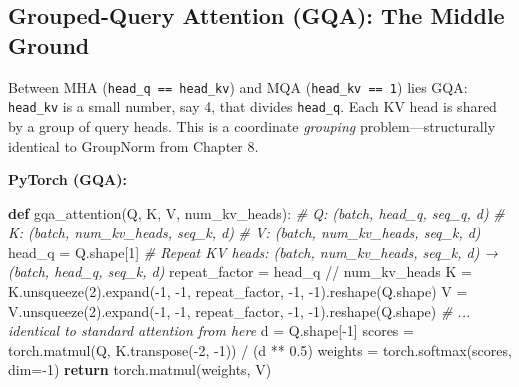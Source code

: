 \documentclass[11pt,titlepage]{article}
\newenvironment{Shaded}{}{}
\newcommand{\CommentTok}[1]{\textcolor[rgb]{0.38,0.63,0.69}{\textit{#1}}}
\newcommand{\ControlFlowTok}[1]{\textcolor[rgb]{0.00,0.44,0.13}{\textbf{#1}}}
\newcommand{\DecValTok}[1]{\textcolor[rgb]{0.25,0.63,0.44}{#1}}
\newcommand{\FloatTok}[1]{\textcolor[rgb]{0.25,0.63,0.44}{#1}}
\newcommand{\KeywordTok}[1]{\textcolor[rgb]{0.00,0.44,0.13}{\textbf{#1}}}
\newcommand{\NormalTok}[1]{#1}
\newcommand{\OperatorTok}[1]{\textcolor[rgb]{0.40,0.40,0.40}{#1}}
\begin{document}
\vspace{2em}

\hypertarget{grouped-query-attention-gqa-the-middle-ground}{%
\subsection{Grouped-Query Attention (GQA): The Middle
Ground}\label{grouped-query-attention-gqa-the-middle-ground}}

Between MHA (\texttt{head\_q\ ==\ head\_kv}) and MQA
(\texttt{head\_kv\ ==\ 1}) lies GQA: \texttt{head\_kv} is a small
number, say 4, that divides \texttt{head\_q}. Each KV head is shared by
a group of query heads. This is a coordinate \emph{grouping}
problem---structurally identical to GroupNorm from Chapter 8.

\textbf{PyTorch (GQA):}

\begin{Shaded}
\begin{Highlighting}[]
\KeywordTok{def}\NormalTok{ gqa_attention(Q, K, V, num_kv_heads):}
    \CommentTok{# Q: (batch, head_q, seq_q, d)}
    \CommentTok{# K: (batch, num_kv_heads, seq_k, d)}
    \CommentTok{# V: (batch, num_kv_heads, seq_k, d)}
\NormalTok{    head_q }\OperatorTok{=}\NormalTok{ Q.shape[}\DecValTok{1}\NormalTok{]}
    \CommentTok{# Repeat KV heads: (batch, num_kv_heads, seq_k, d) → (batch, head_q, seq_k, d)}
\NormalTok{    repeat_factor }\OperatorTok{=}\NormalTok{ head_q }\OperatorTok{//}\NormalTok{ num_kv_heads}
\NormalTok{    K }\OperatorTok{=}\NormalTok{ K.unsqueeze(}\DecValTok{2}\NormalTok{).expand(}\OperatorTok{-}\DecValTok{1}\NormalTok{, }\DecValTok{-1}\NormalTok{, repeat_factor, }\DecValTok{-1}\NormalTok{, }\DecValTok{-1}\NormalTok{).reshape(Q.shape)}
\NormalTok{    V }\OperatorTok{=}\NormalTok{ V.unsqueeze(}\DecValTok{2}\NormalTok{).expand(}\OperatorTok{-}\DecValTok{1}\NormalTok{, }\DecValTok{-1}\NormalTok{, repeat_factor, }\DecValTok{-1}\NormalTok{, }\DecValTok{-1}\NormalTok{).reshape(Q.shape)}
    \CommentTok{# ... identical to standard attention from here}
\NormalTok{    d }\OperatorTok{=}\NormalTok{ Q.shape[}\OperatorTok{-}\DecValTok{1}\NormalTok{]}
\NormalTok{    scores }\OperatorTok{=}\NormalTok{ torch.matmul(Q, K.transpose(}\OperatorTok{-}\DecValTok{2}\NormalTok{, }\DecValTok{-1}\NormalTok{)) }\OperatorTok{/}\NormalTok{ (d }\OperatorTok{**} \FloatTok{0.5}\NormalTok{)}
\NormalTok{    weights }\OperatorTok{=}\NormalTok{ torch.softmax(scores, dim}\OperatorTok{=-}\DecValTok{1}\NormalTok{)}
    \ControlFlowTok{return}\NormalTok{ torch.matmul(weights, V)}
\end{Highlighting}
\end{Shaded}
\end{document}
